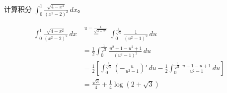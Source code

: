 \begin{questions}
\question 计算积分 $\int_0^1 \frac{\sqrt{4-x^2}}{(x^2-2)^2} \,dx$。
\begin{solution}
\begin{align*}
\int_0^1 \frac{\sqrt{4-x^2}}{(x^2-2)^2} \,dx &\stackrel{u=\frac{x}{\sqrt{4-x^2}}}{=} \int_0^{\frac{1}{\sqrt{3}}} \frac{1}{(u^2-1)^2} \,du \\
&= \frac{1}{2} \int_0^{\frac{1}{\sqrt{3}}} \frac{u^2+1-u^2+1}{(u^2-1)^2} \,du \\
&= \frac{1}{2} \left[ \int_0^{\frac{1}{\sqrt{3}}} \left( -\frac{u}{u^2-1} \right)' \,du - \frac{1}{2} \int_0^{\frac{1}{\sqrt{3}}} \frac{u+1-u+1}{u^2-1} \,du \right] \\
&= \frac{\sqrt{3}}{4} + \frac{1}{4}\log(2+\sqrt{3})
\end{align*}
\end{solution}


\end{questions}
